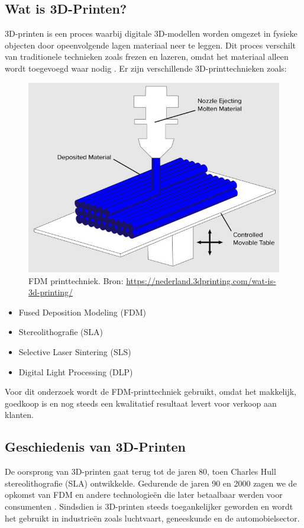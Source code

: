 \subsection{Wat is 3D-Printen?}
3D-printen is een proces waarbij digitale 3D-modellen worden omgezet in fysieke objecten door opeenvolgende lagen materiaal neer te leggen. Dit proces verschilt van traditionele technieken zoals frezen en lazeren, omdat het materiaal alleen wordt toegevoegd waar nodig \autocite{3dPrintingIndustry}. Er zijn verschillende 3D-printtechnieken zoals:
\\
\begin{figure} %
    \centering
    \includegraphics[width=0.8\linewidth]{Foto's/FDM}
    \caption{FDM printtechniek. Bron: \url{https://nederland.3dprinting.com/wat-is-3d-printing/}}
    \label{fig:fdm}
\end{figure}
\begin{itemize}
    \item Fused Deposition Modeling (FDM)
    \item Stereolithografie (SLA)
    \item Selective Laser Sintering (SLS)
    \item Digital Light Processing (DLP)
\end{itemize}
Voor dit onderzoek wordt de FDM-printtechniek gebruikt, omdat het makkelijk, goedkoop is en nog steeds een kwalitatief resultaat levert voor verkoop aan klanten.

\subsection{Geschiedenis van 3D-Printen}
De oorsprong van 3D-printen gaat terug tot de jaren 80, toen Charles Hull stereolithografie (SLA) ontwikkelde. Gedurende de jaren 90 en 2000 zagen we de opkomst van FDM en andere technologieën die later betaalbaar werden voor consumenten \autocite{3dPrintingIndustry}. Sindsdien is 3D-printen steeds toegankelijker geworden en wordt het gebruikt in industrieën zoals luchtvaart, geneeskunde en de automobielsector.

